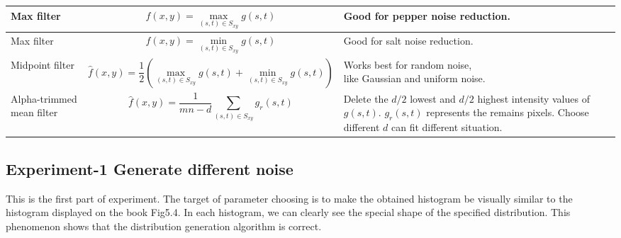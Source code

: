 \begin{table}[h]
\begin{tabular}{|l|m{}|l|}
	\hline 
		Max filter & \begin{equation} \hat{f}(x,y)=\max_{(s,t)\in S_{xy}} {g(s,t)} \end{equation} & Good for pepper noise reduction. \\
	\hline 
		Max filter & \begin{equation} \hat{f}(x,y)=\min_{(s,t)\in S_{xy}} {g(s,t)} \end{equation} & Good for salt noise reduction. \\
	\hline
		Midpoint filter & \begin{equation} \hat{f}(x,y)=\frac{1}{2}\left( \max_{(s,t)\in S_{xy}} {g(s,t)}+\min_{(s,t)\in S_{xy}} {g(s,t)} \right) \end{equation} & \tabincell{l}{Works best for random noise,\\ like Gaussian and uniform noise.} \\
	\hline
		Alpha-trimmed mean filter & \begin{equation} \hat{f}(x,y)=\frac{1}{mn-d}\sum_{(s,t)\in S_{xy}}g_r(s,t) \end{equation} & \tabincell{l}{Delete the $d/2$ lowest and $d/2$ highest\\ intensity values of $g(s,t)$. $g_r(s,t)$ represents\\ the remains pixels. Choose different $d$ \\can fit different situation.}\\
	\hline
	\hline
	\end{tabular}
\end{table}


\subsection{Experiment-1 Generate different noise}
This is the first part of experiment. The target of parameter choosing is to make the obtained histogram be visually similar to the histogram displayed on the book Fig5.4. In each histogram, we can clearly see the special shape of the specified distribution. This phenomenon shows that the distribution generation algorithm is correct.

